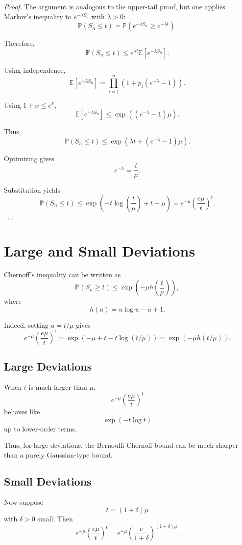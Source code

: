 \documentclass[12pt,oneside]{book}
\numberwithin{equation}{section}
\theoremstyle{definition}
\theoremstyle{plain}
\theoremstyle{remark}
\newcommand{\E}{\mathbb{E}}
\newcommand{\Prob}{\mathbb{P}}
\begin{document}
\begin{proof}
The argument is analogous to the upper-tail proof, but one applies Markov's inequality to $e^{-\lambda S_n}$ with $\lambda>0$:
\[
\Prob(S_n\leq t)
=
\Prob(e^{-\lambda S_n}\geq e^{-\lambda t}).
\]

Therefore,
\[
\Prob(S_n\leq t)
\leq
e^{\lambda t}\E[e^{-\lambda S_n}].
\]

Using independence,
\[
\E[e^{-\lambda S_n}]
=
\prod_{i=1}^n
\left(
1+p_i(e^{-\lambda}-1)
\right).
\]

Using $1+x\leq e^x$,
\[
\E[e^{-\lambda S_n}]
\leq
\exp\left(
(e^{-\lambda}-1)\mu
\right).
\]

Thus,
\[
\Prob(S_n\leq t)
\leq
\exp\left(
\lambda t+(e^{-\lambda}-1)\mu
\right).
\]

Optimizing gives
\[
e^{-\lambda}=\frac{t}{\mu}.
\]

Substitution yields
\[
\Prob(S_n\leq t)
\leq
\exp\left(
-t\log\left(\frac{t}{\mu}\right)+t-\mu
\right)
=
e^{-\mu}
\left(
\frac{e\mu}{t}
\right)^t.
\]
\end{proof}

\section{Large and Small Deviations}

Chernoff's inequality can be written as
\[
\Prob(S_n\geq t)
\leq
\exp\left(
-\mu h\left(\frac{t}{\mu}\right)
\right),
\]
where
\[
h(u)
=
u\log u-u+1.
\]

Indeed, setting $u=t/\mu$ gives
\[
e^{-\mu}\left(\frac{e\mu}{t}\right)^t
=
\exp\left(
-\mu+t-t\log(t/\mu)
\right)
=
\exp\left(
-\mu h(t/\mu)
\right).
\]

\subsection{Large Deviations}

When $t$ is much larger than $\mu$,
\[
e^{-\mu}
\left(
\frac{e\mu}{t}
\right)^t
\]
behaves like
\[
\exp(-t\log t)
\]
up to lower-order terms.

Thus, for large deviations, the Bernoulli Chernoff bound can be much sharper than a purely Gaussian-type bound.

\subsection{Small Deviations}

Now suppose
\[
t=(1+\delta)\mu
\]
with $\delta>0$ small. Then
\[
e^{-\mu}
\left(
\frac{e\mu}{t}
\right)^t
=
e^{-\mu}
\left(
\frac{e}{1+\delta}
\right)^{(1+\delta)\mu}.
\]
\end{document}
